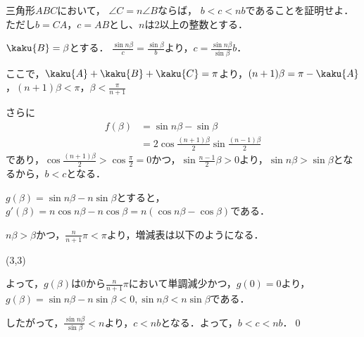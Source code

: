 \begin{problem}
三角形$ABC$において，
$\angle C=n\angle B$ならば，
$b<c<nb$であることを証明せよ．
ただし$b=CA$，$c=AB$とし、$n$は2以上の整数とする．
\end{problem}

$\kaku{B} = \beta$とする．
$\frac{\sin n\beta}{c} = \frac{\sin \beta}{b}$より，$c = \frac{\sin n\beta}{\sin \beta}b$．

ここで，$\kaku{A} + \kaku{B} + \kaku{C} = \pi$より，$(n+1)\beta = \pi - \kaku{A}$，$(n+1)\beta < \pi$，$\beta < \frac{\pi}{n+1}$

さらに
\begin{align*}
  f(\beta) &= \sin n\beta-\sin \beta \\
  &= 2\cos \frac{(n+1)\beta}{2}\sin \frac{(n-1)\beta}{2}
\end{align*}
であり，$\cos \frac{(n+1)\beta}{2} > \cos \frac{\pi}{2} = 0$かつ，$\sin \frac{n-1}{2}\beta > 0$より，$\sin n\beta > \sin \beta$となるから，$b < c$となる．

$g(\beta) = \sin n\beta - n\sin \beta$とすると，
$g'(\beta) = n \cos n\beta - n \cos \beta = n(\cos n\beta - \cos \beta)$である．

$n\beta > \beta$かつ，$\frac{n}{n+1}\pi < \pi$より，増減表は以下のようになる．

\RESETKEYA
{}
\zogen(3,3)

よって，$g(\beta)$は0から$\frac{n}{n+1}\pi$において単調減少かつ，$g(0)=0$より，$g(\beta) = \sin n\beta - n\sin \beta < 0, \sin n\beta < n \sin\beta$である．

したがって，$\frac{\sin n\beta}{\sin \beta} < n$より，$c < nb$となる．よって，$b < c < nb$．\qed
